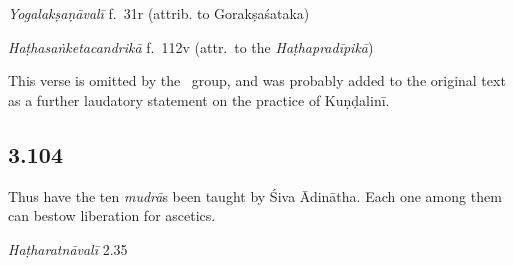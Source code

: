 \begin{ekdosis}
\begin{testimonia}[hp03_103_1]
\emph{Yogalakṣaṇāvalī} f.~31r  (attrib. to Gorakṣaśataka)
\begin{versinnote}
\end{versinnote}


\emph{Haṭhasaṅketacandrikā} f.~112v (attr.~to the \emph{Haṭhapradīpikā})
\begin{versinnote}
\end{versinnote}
\end{testimonia}

\begin{philcomm}[hp03_103_1]
This verse is omitted by the \textalpha\ group, and was probably added to the original text as a further laudatory statement on the practice of Kuṇḍalinī.
\end{philcomm}


\subsection*{3.104}
\begin{translation}[hp03_104]
Thus have the ten \emph{mudrā}s been taught by Śiva Ādinātha. Each one among them can bestow liberation for ascetics.
\end{translation}

\begin{sources}[hp03_104]
\end{sources}

\begin{testimonia}[hp03_104]

\emph{Haṭharatnāvalī} 2.35
\begin{versinnote}
\end{versinnote}


\end{testimonia}
\end{ekdosis}
